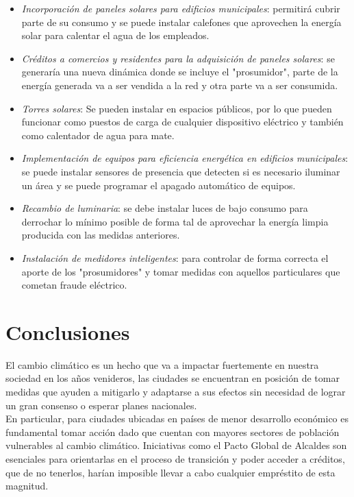 \documentclass[runningheads]{llncs}
\begin{document}
\begin{itemize}
    \item \textit{Incorporación de paneles solares para edificios municipales}: permitirá cubrir parte de su consumo y se puede instalar calefones que aprovechen la energía solar para calentar el agua de los empleados.
    
    \item \textit{Créditos a comercios y residentes para la adquisición de paneles solares}: se generaría una nueva dinámica donde se incluye el "prosumidor", parte de la energía generada va a ser vendida a la red y otra parte va a ser consumida.

    \item \textit{Torres solares}: Se pueden instalar en espacios públicos, por lo que pueden funcionar como puestos de carga de cualquier dispositivo eléctrico y también como calentador de agua para mate.

    \item \textit{Implementación de equipos para eficiencia energética en edificios municipales}: se puede instalar sensores de presencia que detecten si es necesario iluminar un área y se puede programar el apagado automático de equipos.

    \item \textit{Recambio de luminaria}: se debe instalar luces de bajo consumo para derrochar lo mínimo posible de forma tal de aprovechar la energía limpia producida con las medidas anteriores.

    \item \textit{Instalación de medidores inteligentes}: para controlar de forma correcta el aporte de los "prosumidores" y tomar medidas con aquellos particulares que cometan fraude eléctrico. 
\end{itemize}

\section{Conclusiones}

El cambio climático es un hecho que va a impactar fuertemente en nuestra sociedad en los años venideros, las ciudades se encuentran en posición de tomar medidas que ayuden a mitigarlo y adaptarse a sus efectos sin necesidad de lograr un gran consenso o esperar planes nacionales.\\

En particular, para ciudades ubicadas en países de menor desarrollo económico es fundamental tomar acción dado que cuentan con mayores sectores de población vulnerables al cambio climático. Iniciativas como el Pacto Global de Alcaldes son esenciales para orientarlas en el proceso de transición y poder acceder a créditos, que de no tenerlos, harían imposible llevar a cabo cualquier empréstito de esta magnitud.\\
\end{document}
